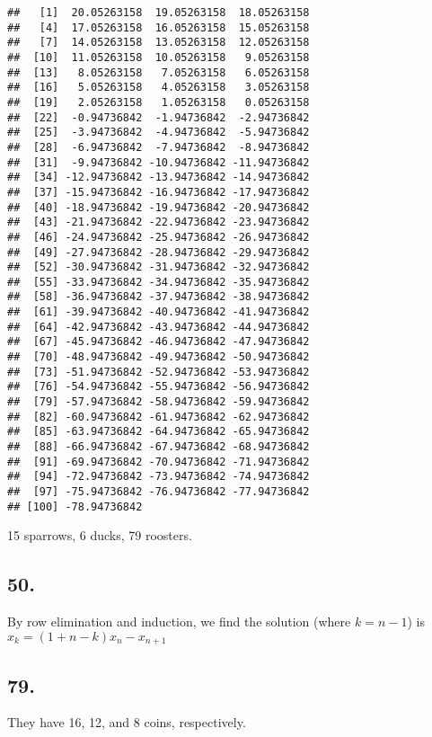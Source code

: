 \documentclass[]{article}
\begin{document}
\begin{verbatim}
##   [1]  20.05263158  19.05263158  18.05263158
##   [4]  17.05263158  16.05263158  15.05263158
##   [7]  14.05263158  13.05263158  12.05263158
##  [10]  11.05263158  10.05263158   9.05263158
##  [13]   8.05263158   7.05263158   6.05263158
##  [16]   5.05263158   4.05263158   3.05263158
##  [19]   2.05263158   1.05263158   0.05263158
##  [22]  -0.94736842  -1.94736842  -2.94736842
##  [25]  -3.94736842  -4.94736842  -5.94736842
##  [28]  -6.94736842  -7.94736842  -8.94736842
##  [31]  -9.94736842 -10.94736842 -11.94736842
##  [34] -12.94736842 -13.94736842 -14.94736842
##  [37] -15.94736842 -16.94736842 -17.94736842
##  [40] -18.94736842 -19.94736842 -20.94736842
##  [43] -21.94736842 -22.94736842 -23.94736842
##  [46] -24.94736842 -25.94736842 -26.94736842
##  [49] -27.94736842 -28.94736842 -29.94736842
##  [52] -30.94736842 -31.94736842 -32.94736842
##  [55] -33.94736842 -34.94736842 -35.94736842
##  [58] -36.94736842 -37.94736842 -38.94736842
##  [61] -39.94736842 -40.94736842 -41.94736842
##  [64] -42.94736842 -43.94736842 -44.94736842
##  [67] -45.94736842 -46.94736842 -47.94736842
##  [70] -48.94736842 -49.94736842 -50.94736842
##  [73] -51.94736842 -52.94736842 -53.94736842
##  [76] -54.94736842 -55.94736842 -56.94736842
##  [79] -57.94736842 -58.94736842 -59.94736842
##  [82] -60.94736842 -61.94736842 -62.94736842
##  [85] -63.94736842 -64.94736842 -65.94736842
##  [88] -66.94736842 -67.94736842 -68.94736842
##  [91] -69.94736842 -70.94736842 -71.94736842
##  [94] -72.94736842 -73.94736842 -74.94736842
##  [97] -75.94736842 -76.94736842 -77.94736842
## [100] -78.94736842
\end{verbatim}

15 sparrows, 6 ducks, 79 roosters.

\hypertarget{section-15}{%
\subsection{50.}\label{section-15}}

By row elimination and induction, we find the solution (where \(k=n-1\))
is \(x_k =(1+n-k)x_n-x_{n+1}\)

\hypertarget{section-16}{%
\subsection{79.}\label{section-16}}

They have 16, 12, and 8 coins, respectively.
\end{document}
